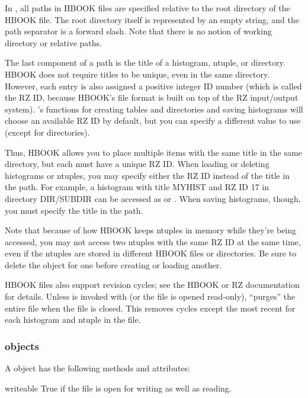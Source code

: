 In \pyhep, all paths in HBOOK files are specified relative to the root
directory of the HBOOK file.  The root directory itself is represented
by an empty string, and the path separator is a forward slash.  Note
that there is no notion of working directory or relative paths.

The last component of a path is the title of a histogram, ntuple, or
directory.  HBOOK does not require titles to be unique, even in the same
directory.  However, each entry is also assigned a positive integer ID
number (which is called the RZ ID, because HBOOK's file format is built
on top of the RZ input/output system).  \pyhep's functions for creating
tables and directories and saving histograms will choose an available RZ
ID by default, but you can specify a different value to use (except for
directories).

Thus, HBOOK allows you to place multiple items with the same title in
the same directory, but each must have a unique RZ ID.  When loading or
deleting histograms or ntuples, you may specify either the RZ ID instead
of the title in the path.  For example, a histogram with title MYHIST
and RZ ID 17 in directory DIR/SUBDIR can be accessed as
 or .  When saving
histograms, though, you must specify the title in the path.

Note that because of how HBOOK keeps ntuples in memory while they're
being accessed, you may not access two ntuples with the same RZ ID at
the same time, even if the ntuples are stored in different HBOOK files
or directories.  Be sure to delete the  object for one
before creating or loading another.

HBOOK files also support revision cycles; see the HBOOK or RZ
documentation for details.  Unless  is invoked with
 (or the file is opened read-only), \pyhep
``purges'' the entire file when the file is closed.  This removes cycles
except the most recent for each histogram and ntuple in the file.

\subsubsection{ objects}

A  object has the following methods and attributes:

\begin{memberdesc}{writeable}
 True if the file is open for writing as well as reading.
\end{memberdesc}

